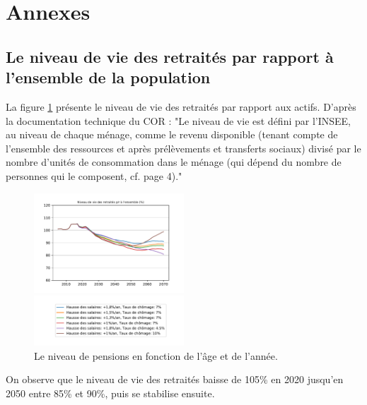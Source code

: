 \documentclass[10pt]{article}
\begin{document}

\section{Annexes}

\subsection{Le niveau de vie des retraités par rapport à l'ensemble de la population}

La figure \ref{fig-simulation-RNV-vs-pensions} présente 
le niveau de vie des retraités par rapport aux actifs. 
D'après la documentation technique du COR : "Le niveau de vie est défini 
par l’INSEE, au niveau de chaque ménage, comme le revenu disponible (tenant
compte de l’ensemble des ressources et après prélèvements et transferts sociaux) 
divisé par le nombre d’unités de consommation dans le ménage 
(qui dépend du nombre de personnes qui le composent, cf. page 4)."

\begin{figure}
\begin{center}
\includegraphics[width=0.5\textwidth]{Simulation-RNV.pdf}

\includegraphics[width=0.5\textwidth]{Simulation-legende.pdf}
\end{center}

\caption{Le niveau de pensions en fonction de l'âge et de l'année.}
\label{fig-simulation-RNV-vs-pensions}
\end{figure}

On observe que le niveau de vie des retraités 
baisse de 105\% en 2020 jusqu'en 2050 entre 85\% et 90\%, puis se stabilise ensuite. 
\end{document}
